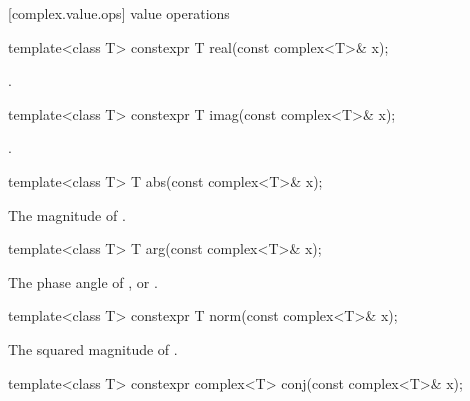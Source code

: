 [complex.value.ops]{ value operations}

%
\begin{itemdecl}
template<class T> constexpr T real(const complex<T>& x);
\end{itemdecl}

\begin{itemdescr}
\pnum
\returns
{}.
\end{itemdescr}

%
\begin{itemdecl}
template<class T> constexpr T imag(const complex<T>& x);
\end{itemdecl}

\begin{itemdescr}
\pnum
\returns
{}.
\end{itemdescr}

%
\begin{itemdecl}
template<class T> T abs(const complex<T>& x);
\end{itemdecl}

\begin{itemdescr}
\pnum
\returns
The magnitude of .
\end{itemdescr}

%
\begin{itemdecl}
template<class T> T arg(const complex<T>& x);
\end{itemdecl}

\begin{itemdescr}
\pnum
\returns
The phase angle of , or .
\end{itemdescr}

%
\begin{itemdecl}
template<class T> constexpr T norm(const complex<T>& x);
\end{itemdecl}

\begin{itemdescr}
\pnum
\returns
The squared magnitude of .
\end{itemdescr}

%
\begin{itemdecl}
template<class T> constexpr complex<T> conj(const complex<T>& x);
\end{itemdecl}

